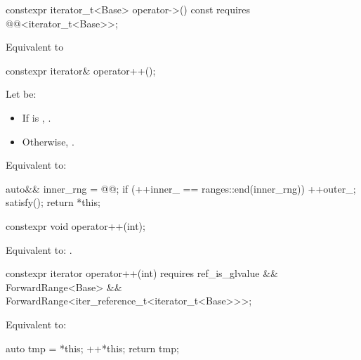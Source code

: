 \begin{itemdecl}
constexpr iterator_t<Base> operator->() const
  requires @@<iterator_t<Base>>;
\end{itemdecl}

\begin{itemdescr}
\pnum
\effects Equivalent to 
\end{itemdescr}

\begin{itemdecl}
constexpr iterator& operator++();
\end{itemdecl}

\begin{itemdescr}
\pnum
Let  be:
\begin{itemize}
\item If  is , .
\item Otherwise, .
\end{itemize}

\pnum
\effects Equivalent to:
\begin{codeblock}
auto&& inner_rng = @@;
if (++inner_ == ranges::end(inner_rng)) {
  ++outer_;
  satisfy();
}
return *this;
\end{codeblock}
\end{itemdescr}

\begin{itemdecl}
constexpr void operator++(int);
\end{itemdecl}

\begin{itemdescr}
\pnum
\effects Equivalent to: .
\end{itemdescr}

\begin{itemdecl}
constexpr iterator operator++(int)
  requires ref_is_glvalue && ForwardRange<Base> &&
           ForwardRange<iter_reference_t<iterator_t<Base>>>;
\end{itemdecl}

\begin{itemdescr}
\pnum
\effects Equivalent to:
\begin{codeblock}
auto tmp = *this;
++*this;
return tmp;
\end{codeblock}
\end{itemdescr}

